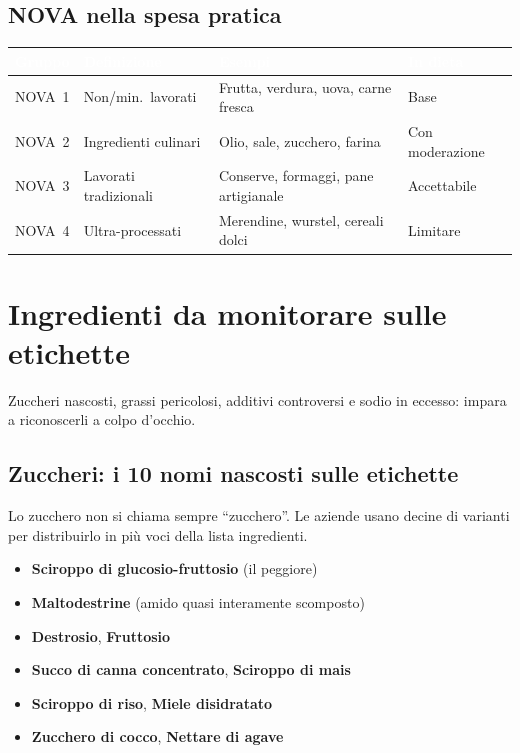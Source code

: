 \documentclass[a5paper,12pt,oneside,openany]{book}
\begin{document}
\section{NOVA nella spesa pratica}

{\small
\begin{tabularx}{\textwidth}{|L|L|L|L|}
\hline
{}
\textcolor{white}{\textbf{Gruppo}}
  & \textcolor{white}{\textbf{Definizione}}
  & \textcolor{white}{\textbf{Esempi}}
  & \textcolor{white}{\textbf{In dieta}} \\
\hline
NOVA~1 & Non/min.\ lavorati & Frutta, verdura, uova, carne fresca & Base \\
\hline
NOVA~2 & Ingredienti culinari & Olio, sale, zucchero, farina & Con moderazione \\
\hline
NOVA~3 & Lavorati tradizionali & Conserve, formaggi, pane artigianale & Accettabile \\
\hline
NOVA~4 & Ultra-processati & Merendine, wurstel, cereali dolci & Limitare \\
\hline
\end{tabularx}
}

\chapter{Ingredienti da monitorare sulle etichette}

Zuccheri nascosti, grassi pericolosi, additivi controversi e sodio in
eccesso: impara a riconoscerli a colpo d'occhio.

\section{Zuccheri: i 10 nomi nascosti sulle etichette}

Lo zucchero non si chiama sempre ``zucchero''. Le aziende usano decine di
varianti per distribuirlo in più voci della lista ingredienti.

\begin{itemize}
  \item \textbf{Sciroppo di glucosio-fruttosio} (il peggiore)
  \item \textbf{Maltodestrine} (amido quasi interamente scomposto)
  \item \textbf{Destrosio}, \textbf{Fruttosio}
  \item \textbf{Succo di canna concentrato}, \textbf{Sciroppo di mais}
  \item \textbf{Sciroppo di riso}, \textbf{Miele disidratato}
  \item \textbf{Zucchero di cocco}, \textbf{Nettare di agave}
\end{itemize}
\end{document}

